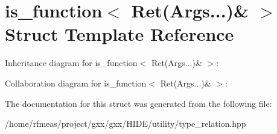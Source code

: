 \hypertarget{structis__function_3_01Ret_07Args_8_8_8_08_6_01_4}{}\section{is\+\_\+function$<$ Ret(Args...)\& $>$ Struct Template Reference}
\label{structis__function_3_01Ret_07Args_8_8_8_08_6_01_4}


Inheritance diagram for is\+\_\+function$<$ Ret(Args...)\& $>$\+:


Collaboration diagram for is\+\_\+function$<$ Ret(Args...)\& $>$\+:


The documentation for this struct was generated from the following file\+:\begin{DoxyCompactItemize}
\item 
/home/rfmeas/project/gxx/gxx/\+H\+I\+D\+E/utility/type\+\_\+relation.\+hpp\end{DoxyCompactItemize}
